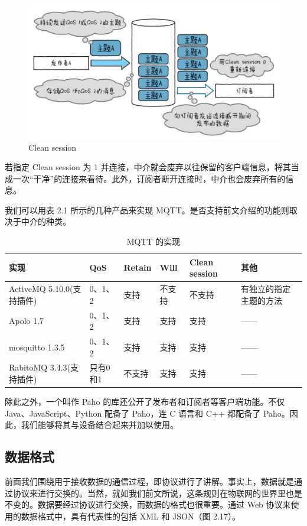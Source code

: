 \documentclass[12pt,UTF8]{ctexbook}
\begin{document}
\begin{figure}[htbp]
	\centering
	\includegraphics[width=1\linewidth]{35}
	\caption{Clean session}
	\label{fig:1}
\end{figure}

若指定 Clean session 为 1 并连接，中介就会废弃以往保留的客户端信息，将其当成一次“干净”的连接来看待。此外，订阅者断开连接时，中介也会废弃所有的信息。

我们可以用表 2.1 所示的几种产品来实现 MQTT。是否支持前文介绍的功能则取决于中介的种类。

\begin{table}[!ht] 
\centering
\caption{MQTT 的实现}
\begin{tabular}{|l|l|l|l|l|l|}
	\hline
	实现 & QoS & Retain & Will & Clean session & 其他 \\
	\hline
	ActiveMQ 5.10.0(支持插件) & 0、1、2 & 支持 & 不支持 & 不支持 & 有独立的指定主题的方法  \\
	\hline
	Apolo 1.7 &	0、1、2 &	支持 & 支持 & 支持 & —— \\
	\hline
	mosquitto 1.3.5 & 0、1、2 & 支持 & 支持 &	支持 & —— \\
	\hline
	RabitoMQ 3.4.3(支持插件) & 只有0和1 & 不支持 & 支持 & 支持 & —— \\
	\hline
\end{tabular}
\end{table}

除此之外，一个叫作 Paho 的库还公开了发布者和订阅者等客户端功能。不仅 Java、JavaScript、Python 配备了 Paho，连 C 语言和 C++ 都配备了 Paho。因此，我们能够将其与设备结合起来并加以使用。

\subsection{数据格式}

前面我们围绕用于接收数据的通信过程，即协议进行了讲解。事实上，数据就是通过协议来进行交换的。当然，就如我们前文所说，这条规则在物联网的世界里也是不变的。数据要经过协议进行交换，而数据的格式也很重要。通过 Web 协议来使用的数据格式中，具有代表性的包括 XML 和 JSON（图 2.17）。
\end{document}
